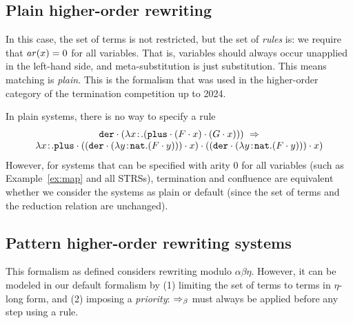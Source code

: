 \subsection{Plain higher-order rewriting~\cite{jou:rub:99}}

In this case, the set of terms is not restricted, but the set of \emph{rules} is: we require that
$\mathit{ar}(x) = 0$ for all variables.  That is, variables should always occur unapplied in the
left-hand side, and meta-substitution is just substitution.  This means matching is \emph{plain}.
This is the formalism that was used in the higher-order category of the termination competition up
to 2024.

\begin{example}
In plain systems, there is no way to specify a rule
\[
\begin{array}{c}
\app{\symb{der}}{(\abs{\avar}{\real}{(\app{\app{\symb{plus}}{(\app{F}{\avar})}}{(\app{G}{\avar})})})}\ \arrz \\
\abs{\avar}{\real}{\app{\app{\symb{plus}}{
    (\app{(\app{\symb{der}}{(\abs{\bvar}{\nat}{(\app{F}{\bvar})})})}{\avar})
  }}{
    (\app{(\app{\symb{der}}{(\abs{\bvar}{\nat}{(\app{F}{\bvar})})})}{\avar})
  }}
\end{array}
\]
However, for systems that can be specified with arity $0$ for all variables (such as
Example~\ref{ex:map} and all STRSs), termination and confluence are equivalent whether we consider
the systems as plain or default (since the set of terms and the reduction relation are unchanged).
\end{example}

\subsection{Pattern higher-order rewriting systems~\cite{nip:91}}

This formalism as defined considers rewriting modulo $\alpha\beta\eta$.  However, it can be
modeled in our default formalism by (1) limiting the set of terms to terms in $\eta$-long form, and
(2) imposing a \emph{priority}: $\Rightarrow_{\beta}$ must always be applied before any step using a rule.

